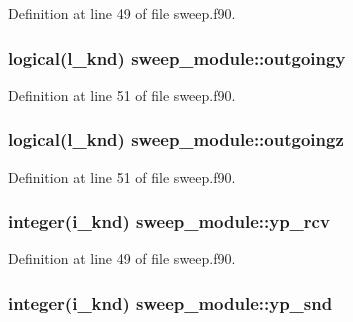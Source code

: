 Definition at line 49 of file sweep.\-f90.

\hypertarget{classsweep__module_a951a915875e576860980173b5ae9f23d}{
\subsubsection[{outgoingy}]{\setlength{\rightskip}{0pt plus 5cm}logical(l\-\_\-knd) sweep\-\_\-module\-::outgoingy\hspace{0.3cm}{\ttfamily [private]}}}\label{classsweep__module_a951a915875e576860980173b5ae9f23d}


Definition at line 51 of file sweep.\-f90.

\hypertarget{classsweep__module_a219e782e7e79e82858addb91583fcae8}{
\subsubsection[{outgoingz}]{\setlength{\rightskip}{0pt plus 5cm}logical(l\-\_\-knd) sweep\-\_\-module\-::outgoingz\hspace{0.3cm}{\ttfamily [private]}}}\label{classsweep__module_a219e782e7e79e82858addb91583fcae8}


Definition at line 51 of file sweep.\-f90.

\hypertarget{classsweep__module_a709eb6789a39f6937645ba7022192e99}{
\subsubsection[{yp\-\_\-rcv}]{\setlength{\rightskip}{0pt plus 5cm}integer(i\-\_\-knd) sweep\-\_\-module\-::yp\-\_\-rcv\hspace{0.3cm}{\ttfamily [private]}}}\label{classsweep__module_a709eb6789a39f6937645ba7022192e99}


Definition at line 49 of file sweep.\-f90.

\hypertarget{classsweep__module_a1aab688bcb2aaa33a5bf60e57385d575}{
\subsubsection[{yp\-\_\-snd}]{\setlength{\rightskip}{0pt plus 5cm}integer(i\-\_\-knd) sweep\-\_\-module\-::yp\-\_\-snd\hspace{0.3cm}{\ttfamily [private]}}}\label{classsweep__module_a1aab688bcb2aaa33a5bf60e57385d575}


